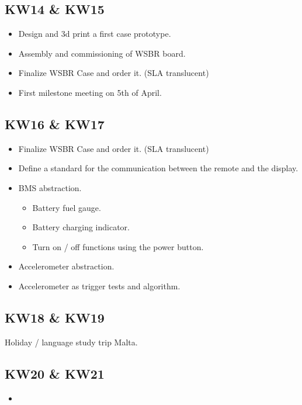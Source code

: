 \subsection{KW14 \& KW15}
\label{ssec:KW14_KW15}
\begin{itemize}
    \item Design and 3d print a first case prototype.
    \item Assembly and commissioning of WSBR board.
    \item Finalize WSBR Case and order it. (SLA translucent)
    \item First milestone meeting on 5th of April.
\end{itemize}


\subsection{KW16 \& KW17}
\label{ssec:KW16_KW17}
\begin{itemize}
    \item Finalize WSBR Case and order it. (SLA translucent)
    \item Define a standard for the communication between the remote and the display.
    \item BMS abstraction.
    \begin{itemize}
        \item Battery fuel gauge.
        \item Battery charging indicator.
        \item Turn on / off functions using the power button.
    \end{itemize}
    \item Accelerometer abstraction.
    \item Accelerometer as trigger tests and algorithm.
\end{itemize}


\subsection{KW18 \& KW19}
\label{ssec:KW18_KW19}
Holiday / language study trip Malta.


\subsection{KW20 \& KW21}
\label{ssec:KW20_KW21}
\begin{itemize}
    \item 
\end{itemize}


